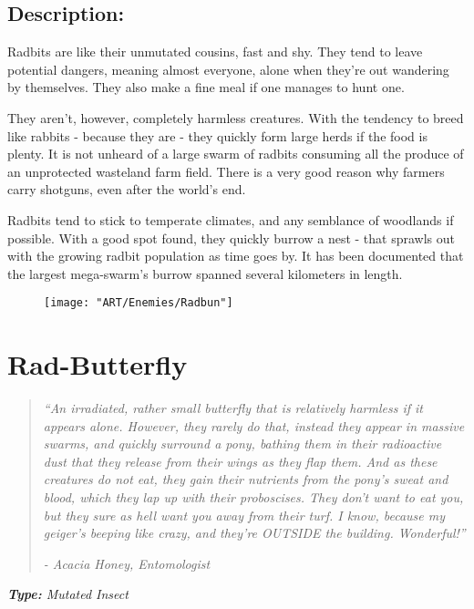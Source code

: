\documentclass[11pt,a4paper,twocolumn]{book}
\begin{document}
	\subsection*{Description:}
	Radbits are like their unmutated cousins, fast and shy. They tend to leave potential dangers, meaning almost everyone, alone when they're out wandering by themselves. They also make a fine meal if one manages to hunt one.
	
	They aren't, however, completely harmless creatures. With the tendency to breed like rabbits - because they are - they quickly form large herds if the food is plenty. It is not unheard of a large swarm of radbits consuming all the produce of an unprotected wasteland farm field. There is a very good reason why farmers carry shotguns, even after the world's end.
	
	Radbits tend to stick to temperate climates, and any semblance of woodlands if possible. With a good spot found, they quickly burrow a nest - that sprawls out with the growing radbit population as time goes by. It has been documented that the largest mega-swarm's burrow spanned several kilometers in length.
	
	\begin{figure}[h]
		\centering
		\texttt{[image: "ART/Enemies/Radbun"]}
	\end{figure}
	
	\clearpage
	
	\section*{Rad-Butterfly}
	\begin{quote}
		\emph{``An irradiated, rather small butterfly that is relatively harmless if it appears alone. However, they rarely do that, instead they appear in massive swarms, and quickly surround a pony, bathing them in their radioactive dust that they release from their wings as they flap them. And as these creatures do not eat, they gain their nutrients from the pony's sweat and blood, which they lap up with their proboscises. They don't want to eat you, but they sure as hell want you away from their turf. I know, because my geiger's beeping like crazy, and they're OUTSIDE the building. Wonderful!''}
		
		\emph{-	Acacia Honey, Entomologist}
	\end{quote}
	
	\emph{\textbf{Type:} Mutated Insect}
	
\end{document}
